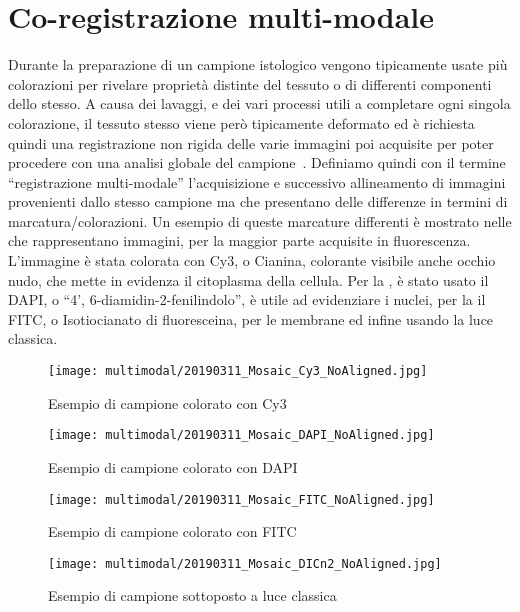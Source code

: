 \section{Co-registrazione multi-modale}
\noindent Durante la preparazione di un campione istologico vengono tipicamente usate più colorazioni per rivelare proprietà distinte del tessuto o di differenti componenti dello stesso. A causa dei lavaggi, e dei vari processi utili a completare ogni singola colorazione, il tessuto stesso viene però tipicamente deformato ed è richiesta quindi una registrazione non rigida delle varie immagini poi acquisite per poter procedere con una analisi globale del campione~\cite{9058666}.\hfill \break
\noindent Definiamo quindi con il termine ``registrazione multi-modale'' l'acquisizione e successivo allineamento di immagini provenienti dallo stesso campione ma che presentano delle differenze in termini di marcatura/colorazioni. Un esempio di queste marcature differenti è mostrato nelle  che rappresentano immagini, per la maggior parte acquisite in fluorescenza. L'immagine  è stata colorata con Cy3, o Cianina, colorante visibile anche occhio nudo, che mette in evidenza il citoplasma della cellula.
Per la , è stato usato il DAPI, o ``4', 6-diamidin-2-fenilindolo'', è utile ad evidenziare i nuclei, per la  il FITC, o Isotiocianato di fluoresceina, per le membrane ed infine  usando la luce classica. \par
\noindent 
\begin{figure}[H]
    \centering
    \texttt{[image: multimodal/20190311\_Mosaic\_Cy3\_NoAligned.jpg]}
    \caption{Esempio di campione colorato con Cy3}
    \label{fig:1}
\end{figure}
\begin{figure}[H]
    \centering
    \texttt{[image: multimodal/20190311\_Mosaic\_DAPI\_NoAligned.jpg]}
    \caption{Esempio di campione colorato con DAPI}
    \label{fig:2}
\end{figure}
\begin{figure}[H]
    \centering
    \texttt{[image: multimodal/20190311\_Mosaic\_FITC\_NoAligned.jpg]}
    \caption{Esempio di campione colorato con FITC}
    \label{fig:3}
\end{figure}
\begin{figure}[H]
    \centering
    \texttt{[image: multimodal/20190311\_Mosaic\_DICn2\_NoAligned.jpg]}
    \caption{Esempio di campione sottoposto a luce classica}
    \label{fig:4}
\end{figure}
